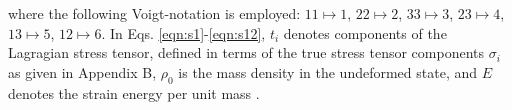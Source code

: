 \documentclass[showpacs,aps,floatfix,prb,reprint,superscriptaddress]{revtex4-1}
\begin{document}
where the following Voigt-notation is employed: $11 \mapsto 1$, $22 \mapsto 2$, $33 \mapsto 3$, $23 \mapsto 4$, $13 \mapsto 5$, $12 \mapsto 6$.  In Eqs. \ref{eqn:s1}-\ref{eqn:s12}, $t_{i}$ denotes components of the Lagragian stress tensor, defined in terms of the true stress tensor components $\sigma_{i}$ as given in Appendix B, $\rho_0$ is the mass density in the undeformed state, and $E$ denotes the strain energy per unit mass \cite{lopuszynski2007ab}.

\end{document}
